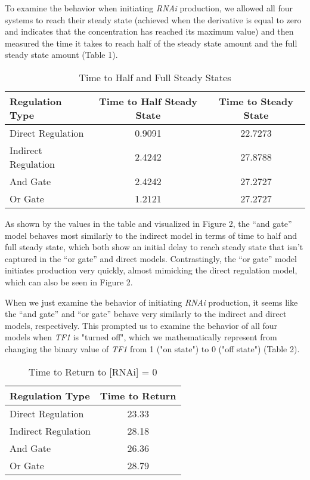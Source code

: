 \documentclass{article}
\begin{document}
To examine the behavior when initiating \textit{RNAi} production, we allowed all four systems to reach their steady state (achieved when the derivative is equal to zero and indicates that the concentration has reached its maximum value) and then measured the time it takes to reach half of the steady state amount and the full steady state amount (Table 1).

\begin{table}[h]
    \centering
    \caption{Time to Half and Full Steady States}
    \begin{tabular}{@{}lcc@{}}
        \toprule
        \textbf{Regulation Type} & \textbf{Time to Half Steady State} & \textbf{Time to Steady State} \\ 
        \midrule
        Direct Regulation & 0.9091 & 22.7273 \\ 
        Indirect Regulation & 2.4242 & 27.8788 \\ 
        And Gate & 2.4242 & 27.2727 \\ 
        Or Gate & 1.2121 & 27.2727 \\ 
        \bottomrule
    \end{tabular}
\end{table}

\pagebreak

As shown by the values in the table and visualized in Figure 2, the ``and gate'' model behaves most similarly to the indirect model in terms of time to half and full steady state, which both show an initial delay to reach steady state that isn't captured in the ``or gate'' and direct models. Contrastingly, the ``or gate'' model initiates production very quickly, almost mimicking the direct regulation model, which can also be seen in Figure 2. 

When we just examine the behavior of initiating \textit{RNAi} production, it seems like the ``and gate'' and ``or gate'' behave very similarly to the indirect and direct models, respectively. This prompted us to examine the behavior of all four models when \textit{TF1} is "turned off", which we mathematically represent from changing the binary value of \textit{TF1} from 1 ("on state") to 0 ("off state") (Table 2). 

\begin{table}[h]
    \centering
    \caption{Time to Return to [RNAi] = 0}
    \begin{tabular}{@{}lc@{}}
        \toprule
        \textbf{Regulation Type} & \textbf{Time to Return} \\ 
        \midrule
        Direct Regulation & 23.33 \\ 
        Indirect Regulation & 28.18 \\ 
        And Gate & 26.36 \\ 
        Or Gate & 28.79 \\ 
        \bottomrule
    \end{tabular}
\end{table}
\end{document}
